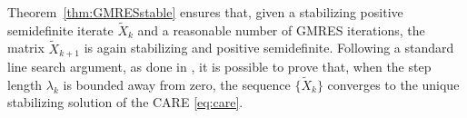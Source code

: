\documentclass[a4paper,10pt]{article}
\newtheorem{theorem}[definition]{Theorem}
\begin{document}
Theorem~\ref{thm:GMRESstable} ensures that, given a  stabilizing positive semidefinite iterate $\tilde X_k$ and a reasonable number of GMRES iterations, the matrix $\tilde X_{k+1}$ is again stabilizing and positive semidefinite. Following a standard line search argument, as done in \cite[Theorem 10]{benner2016inexact},  it is possible to prove that, when the step length $\lambda_k$ is bounded away from zero, the sequence $\{\tilde X_k\}$ converges to the unique stabilizing solution of the CARE \eqref{eq:care}. 
%
%
%
%
%
%
%
%
%
%
%
%	
\end{document}
